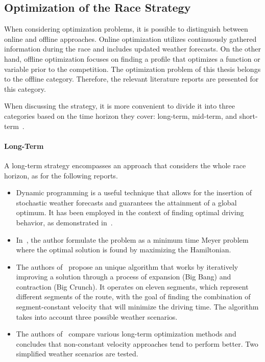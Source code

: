 \subsection{Optimization of the Race Strategy}
When considering optimization problems, it is possible to distinguish between online and offline approaches. Online optimization utilizes continuously gathered information during the race and includes updated weather forecasts. On the other hand, offline optimization focuses on finding a profile that optimizes a function or variable prior to the competition. The optimization problem of this thesis belongs to the offline category. Therefore, the relevant literature reports are presented for this category.

When discussing the strategy, it is more convenient to divide it into three categories based on the time horizon they cover: long-term, mid-term, and short-term~\cite{SolUTra:2006mt}.

\paragraph{Long-Term}
A long-term strategy encompasses an approach that considers the whole race horizon, as for the following reports.
\begin{itemize}
	\item Dynamic programming is a useful technique that allows for the insertion of stochastic weather forecasts and guarantees the attainment of a global optimum. It has been employed in the context of finding optimal driving behavior, as demonstrated in~\cite{racingWithTheSun:1997}.
	\item In~\cite{optimalEnergyManagement:2000book}, the author formulate the problem as a minimum time Meyer problem where the optimal solution is found by maximizing the Hamiltonian.
	\item The authors of~\cite{strategyOptimizationOfSolarCar:2013} propose an unique algorithm that works by iteratively improving a solution through a process of expansion (Big Bang) and contraction (Big Crunch). It operates on eleven segments, which represent different segments of the route, with the goal of finding the combination of segment-constant velocity that will minimize the driving time. The algorithm takes into account three possible weather scenarios.
	\item The authors of~\cite{heuristicOptimizationForTheEnergyManagement:2017article} compare various long-term optimization methods and concludes that non-constant velocity approaches tend to perform better. Two simplified weather scenarios are tested.
\end{itemize}
